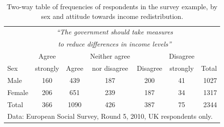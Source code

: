 \begin{table}
\caption{Two-way table of frequencies of respondents in the survey example,
by sex and attitude towards income redistribution.}
\label{t_sex_attitude}
\begin{center}
\begin{tabular}{|l|ccccc|r|}\hline
& \multicolumn{5}{|c|}{\emph{``The government should
take measures}} & \\
& \multicolumn{5}{|c|}{\emph{to reduce differences in income levels''}}
& \\[.3ex]
 & Agree & & Neither agree & & Disagree & \\
Sex & strongly & Agree & nor disagree & Disagree & strongly & Total \\ \hline
Male &  160& 439 & 187 &200  & 41 & 1027 \\
Female & 206 & 651 & 239 & 187 & 34 & 1317\\
\hline
Total & 366 & 1090 & 426 & 387 & 75 & 2344 \\
\hline
\multicolumn{7}{l}{\scriptsize Data: European Social Survey, Round 5,
2010, UK respondents only.}
\end{tabular}
\end{center}
\vspace*{-3ex}
\end{table}

